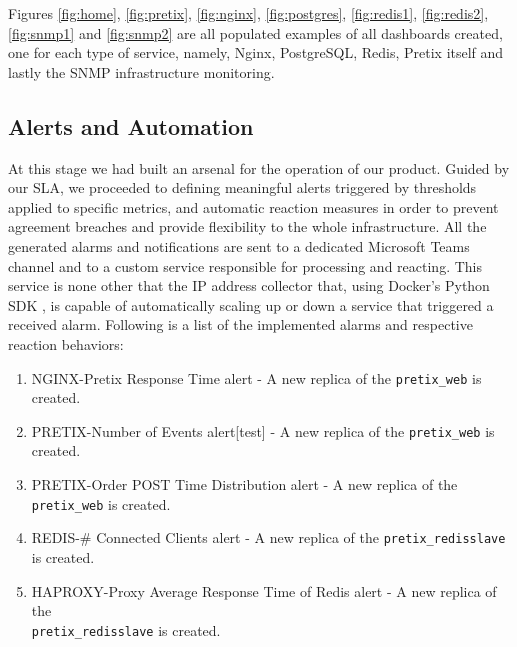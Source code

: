 \documentclass[12pt]{article}
\begin{document}
Figures \ref{fig:home}, \ref{fig:pretix}, \ref{fig:nginx}, \ref{fig:postgres}, \ref{fig:redis1}, \ref{fig:redis2}, \ref{fig:snmp1} and \ref{fig:snmp2} are all populated examples of all dashboards created, one for each type of service, namely, Nginx, PostgreSQL, Redis, Pretix itself and lastly the SNMP infrastructure monitoring.

\subsection{Alerts and Automation} \label{management.automation} %


At this stage we had built an arsenal for the operation of our product.
Guided by our SLA, we proceeded to defining meaningful alerts triggered by thresholds applied to specific metrics, and automatic reaction measures in order to
prevent agreement breaches and provide flexibility to the whole infrastructure.
All the generated alarms and notifications are sent to a dedicated Microsoft Teams channel and to a custom service responsible for processing and reacting.
This service is none other that the IP address collector that, using Docker's Python SDK \cite{dockerpythonsdk}, is capable of automatically scaling up or down
a service that triggered a received alarm.
Following is a list of the implemented alarms and respective reaction behaviors:

\vspace{-10pt}
\begin{enumerate}[noitemsep]
  \item NGINX-Pretix Response Time alert - A new replica of the \texttt{pretix\_web} is created.
  \item PRETIX-Number of Events alert[test] - A new replica of the \texttt{pretix\_web} is created.
  \item PRETIX-Order POST Time Distribution alert - A new replica of the \texttt{pretix\_web} is created.
  \item REDIS-\# Connected Clients alert - A new replica of the \texttt{pretix\_redisslave} is created.
  \item HAPROXY-Proxy Average Response Time of Redis alert - A new replica of the \\\texttt{pretix\_redisslave} is created.
\end{enumerate}
\vspace{-10pt}
\end{document}
